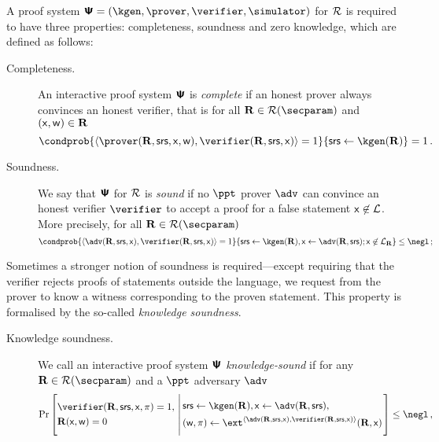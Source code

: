 \documentclass[runningheads,11pt]{llncs}
\begin{document}
A proof system $\proofsystem = (\kgen, \prover, \verifier, \simulator)$ for $\mathcal{R}$ is required to have three properties: completeness, soundness and zero knowledge, which are defined as follows:
\begin{description}
\item[Completeness.]
  An interactive proof system $\bm{\mathsf{\Psi}}$ is
  \emph{complete} if an honest prover always convinces an honest verifier, that
  is for all $\REL \in \RELGEN(\secparam)$ and $(\mathsf{x}, \mathsf{w}) \in \mathbf{R}$
	\[
		\condprob{\ip{\prover (\REL, \srs, \inp, \wit)}{\verifier (\REL, \srs,
        \inp)} = 1}{\srs \gets \kgen(\REL)} = 1\,.
	\]
\item[Soundness.] We say that $\bm{\mathsf{\Psi}}$ for $\mathcal{R}$ is \emph{sound} if no
  $\ppt$ prover $\adv$ can convince an honest verifier $\verifier$ to accept a
  proof for a false statement $\mathsf{x} \not\in\mathcal{L}$. More precisely, for all
  $\REL \in \RELGEN(\secparam)$
	\[
      \condprob{\ip{\adv(\REL, \srs, \inp)}{\verifier(\REL, \srs, \inp)} =
        1}{\srs \gets \kgen(\REL), \inp \gets \adv(\REL, \srs); \inp \not\in
        \LANG_\REL} \leq \negl\,;
	\]
\end{description}
Sometimes a stronger notion of soundness is required---except requiring that the
verifier rejects proofs of statements outside the language, we request from the
prover to know a witness corresponding to the proven statement. This property is
formalised by the so-called \emph{knowledge soundness}.
\begin{description}
\item[Knowledge soundness.]
We call an interactive proof system $\bm{\mathsf{\Psi}}$
\emph{knowledge-sound} if for any $\REL \in \RELGEN(\secparam)$ and a $\ppt$
adversary $\adv$
	\[
	\Pr\left[
		\begin{aligned}
			& \verifier(\REL, \srs, \inp, \zkproof) = 1, \\
			& \REL(\inp, \wit) = 0
	 \end{aligned}
	  \,\left|\,
	 \begin{aligned}
		 & \srs \gets \kgen(\REL), \inp \gets \adv(\REL, \srs), \\
		 & (\wit, \zkproof) \gets \ext^{\ip{\adv(\REL, \srs, \inp)}{\verifier(\REL, \srs, \inp)}}(\REL, \inp)
	 \end{aligned}
	 \vphantom{\begin{aligned}
		 \adv (\zkproof) = 1, \\
		 \text{if $\zkproof{}$ is accepting} \\
		 \pcind \text{then $\REL(\inp, \wit)$}
	 \end{aligned}}\right.
	 \right] \leq \negl\,,
 \]
\end{description}
\end{document}
